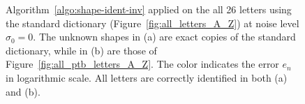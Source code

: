 \begin{figure}[htp]
  \centering
  \caption{Algorithm~\ref{algo:shape-ident-inv} applied on the all 26
    letters using the standard dictionary
    (Figure~\ref{fig:all_letters_A_Z}) at noise level
    $\sigma_0=0$. The unknown shapes in (a) are exact copies of the
    standard dictionary, while in (b) are those of
    Figure~\ref{fig:all_ptb_letters_A_Z}. The color indicates the
    error $e_n$ in logarithmic scale. All letters are correctly
    identified in both (a) and (b).}
  \label{fig:matching_all_letters_inv}
\end{figure}

